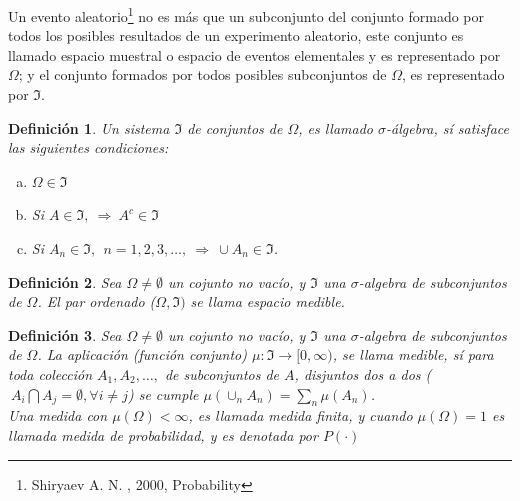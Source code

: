 \documentclass[12pt]{report}
\newtheorem{defi}{{\bf Definición}}[chapter]
\begin{document}
  
	
	Un evento aleatorio{\footnote{Shiryaev A. N. ,  2000, Probability}} no es más que un subconjunto del conjunto formado por todos los posibles resultados de un experimento aleatorio, este conjunto es llamado espacio muestral o espacio de eventos elementales y es  representado por  $\Omega$; y el conjunto formados por todos posibles subconjuntos de $\Omega$, es representado por $\Im$. \\
	
	\begin{defi}
		
		Un sistema  $\Im$  de conjuntos de $\Omega$, es llamado  $\sigma$-álgebra,  sí satisface las siguientes condiciones: 
		
		
		
		\begin{enumerate}[a.-]
			
			\item $\Omega\in \Im$
			\item Si  $ A \in \Im, \: \Rightarrow \:  A^{c} \in \Im$
			\item Si $ A_{n}  \in  \Im, \:\: n = 1, 2 ,3,\ldots, \: \Rightarrow \:  \cup A_{n} \in \Im  $.
			
		\end{enumerate}
		
	\end{defi}
	
	
	
	\begin{defi}
		
		
		Sea  $\Omega   \neq   \emptyset $ un cojunto no vacío,  y  $\Im$ una  $\sigma$-algebra de subconjuntos de $\Omega$. El par ordenado ($\Omega, \Im )$  se llama espacio medible.
		
	\end{defi}
	
	
	
	
	\begin{defi}
		
		
		Sea  $\Omega   \neq   \emptyset $ un cojunto no vacío,  y  $\Im$ una  $\sigma$-algebra de subconjuntos de $\Omega$.  La aplicación (función  conjunto)   $\mu : \Im \longrightarrow  [0,\infty)$,  
		se llama medible, sí para toda colección \: $A_{1}, A_{2}, \ldots,$ de subconjuntos de $A$, disjuntos dos a dos ($ \:A_{i} \bigcap  A_{j}  = \emptyset, \forall i \neq j $)   se cumple  $ \mu( \cup_{n} A_{n}) = \sum_{n}\mu(A_{n})$.\\
		
		
		Una  medida con $\mu(\Omega) < \infty$, es llamada medida finita, y cuando 
		$\mu(\Omega) =1$ es llamada medida de probabilidad, y es denotada por $P(\cdot)$
	\end{defi}
	
\end{document}
